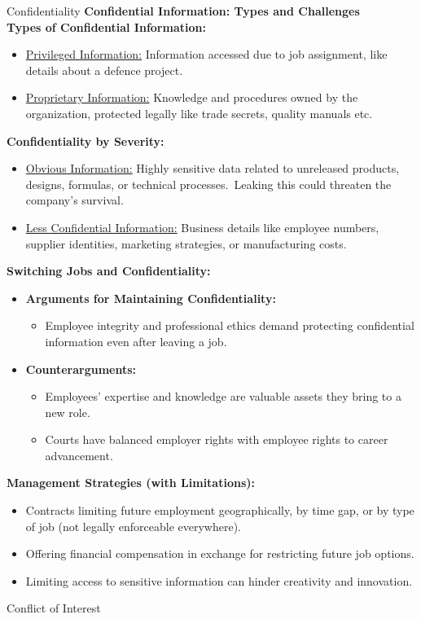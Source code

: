 \documentclass[11pt]{beamer}
\begin{document}
\begin{frame}[t,allowframebreaks]{Confidentiality}
        \textbf{Confidential Information: Types and Challenges}\\[10pt]
        \textbf{Types of Confidential Information:}\\[5pt]
        \begin{itemize}
            \item \ul{Privileged Information:} Information accessed due to job assignment, like details about a
            defence project.
            \item \ul{Proprietary Information:} Knowledge and procedures owned by the organization, protected legally
            like trade secrets, quality manuals etc.
        \end{itemize}
        \textbf{Confidentiality by Severity:}\\[5pt]
        \begin{itemize}
            \item \ul{Obvious Information:} Highly sensitive data related to unreleased products, designs, formulas,
            or technical processes.\ Leaking this could threaten the company's survival.
            \item \ul{Less Confidential Information:} Business details like employee numbers, supplier identities,
            marketing strategies, or manufacturing costs.
        \end{itemize}
        \textbf{Switching Jobs and Confidentiality:}
        \begin{itemize}
            \item \textbf{Arguments for Maintaining Confidentiality:}
            \begin{itemize}
                \item Employee integrity and professional ethics demand protecting confidential information even
                after leaving a job.
            \end{itemize}
            \item \textbf{Counterarguments:}
            \begin{itemize}
                \item Employees' expertise and knowledge are valuable assets they bring to a new role.
                \item Courts have balanced employer rights with employee rights to career advancement.
            \end{itemize}
        \end{itemize}
        \textbf{Management Strategies (with Limitations):}
        \begin{itemize}
            \item Contracts limiting future employment geographically, by time gap, or by type of job (not legally
            enforceable everywhere).
            \item Offering financial compensation in exchange for restricting future job options.
            \item Limiting access to sensitive information can hinder creativity and innovation.
        \end{itemize}
    \end{frame}

    \begin{frame}[t]{Conflict of Interest}
    \end{frame}
\end{document}
